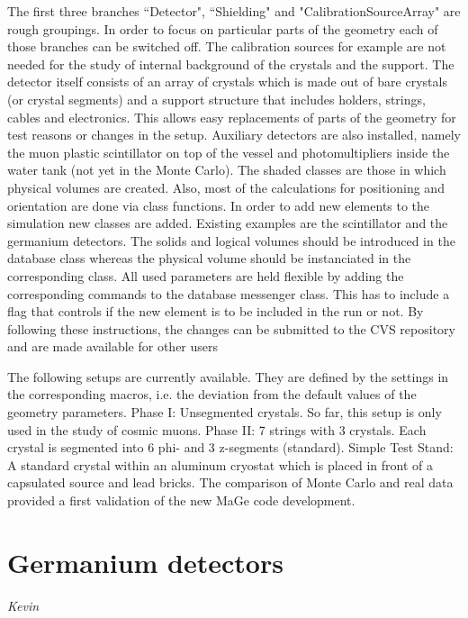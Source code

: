 The first three branches ``Detector", ``Shielding" and
"CalibrationSourceArray" are rough groupings. In order to focus on
particular parts of the geometry each of those branches can be 
switched off. The calibration sources for example are not needed for 
the study of internal background of the crystals and the support.
The detector itself consists of an array of crystals which is made out
of bare crystals (or crystal segments) and a support structure that
includes holders, strings, cables and electronics. This allows easy
replacements of parts of the geometry for test reasons or changes in
the setup.  Auxiliary detectors are also installed, namely the muon
plastic scintillator on top of the vessel and photomultipliers inside
the water tank (not yet in the Monte Carlo).
The shaded classes are those in which physical volumes are
created. Also, most of the calculations for positioning and
orientation are done via class functions.
In order to add new elements to the simulation new classes are added.
Existing examples are the scintillator and the germanium
detectors. The solids and logical volumes should be introduced in the
database class whereas the physical volume should be instanciated in
the corresponding class. All used parameters are held flexible by
adding the corresponding commands to the database messenger
class. This has to include a flag that controls if the new element is
to be included in the run or not. By following these instructions, the
changes can be submitted to the CVS repository and are made available
for other users


 The following setups are currently available. They are defined by the
settings in the corresponding macros, i.e. the deviation from the
default values of the geometry parameters.
 Phase I:           Unsegmented crystals. So far, this setup is only used in the study of cosmic muons.
 Phase II:          7 strings with 3 crystals. Each crystal is segmented into 6 phi-{} and 3 z-{}segments (standard).
 Simple Test Stand: A standard crystal within an aluminum cryostat which is placed in front of a capsulated
       source and lead bricks. The comparison of Monte Carlo and real data provided a first
       validation of the new MaGe code development.
 
\section{Germanium detectors} 
{\it Kevin} \\ 

